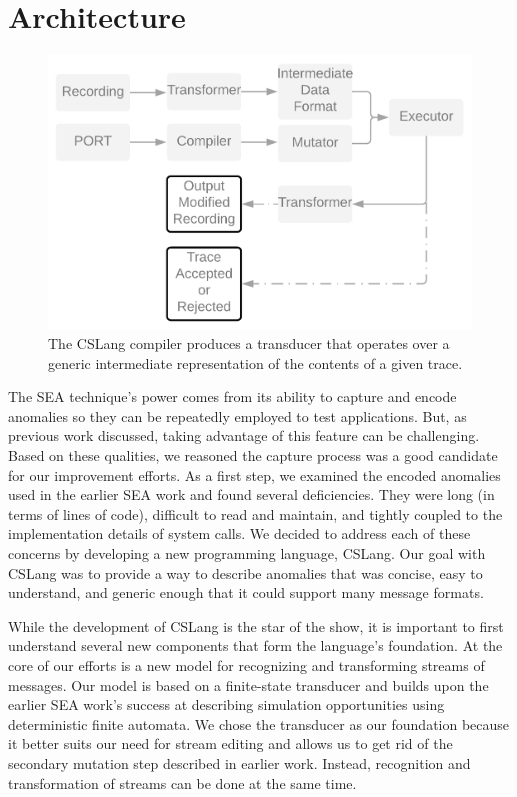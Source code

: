 \section{Architecture}
\label{SEC:architecture}

\begin{figure}
  \includegraphics[scale=.08, frame]{images/architecture}
  \caption{The CSLang compiler produces a transducer that operates over a
  generic intermediate representation of the contents of a given trace.}
  \label{fig:architecture}
\end{figure}


The SEA technique's power comes from its ability to capture and encode
anomalies so they can be repeatedly employed to test applications.  But, as
previous work discussed, taking advantage of this feature can be
challenging.  Based on these qualities, we reasoned the capture process
was a good candidate for our improvement efforts.
As a first step, we examined the encoded anomalies used in the
earlier SEA work and found several deficiencies.
They were
long (in terms of lines of code),
difficult to read and maintain,
and tightly coupled to the implementation details of system calls.
We decided to address each of these concerns by developing a new
programming language, CSLang.  Our goal with CSLang was to provide a way to
describe anomalies that was concise, easy to understand, and generic enough
that it could support many message formats.

While the development of CSLang
is the star of the show,
it is important to first understand
several new components
that form the language's foundation.
At the core of our efforts is
a new model for recognizing and transforming streams of messages.  Our
model is based on a finite-state transducer and builds upon the earlier SEA
work's success at describing simulation opportunities using deterministic
finite automata.  We chose the transducer as our foundation
because it better suits our need for stream editing and allows us to get
rid of the secondary mutation step described in earlier work.
Instead, recognition and transformation of streams can be done at the same time.

